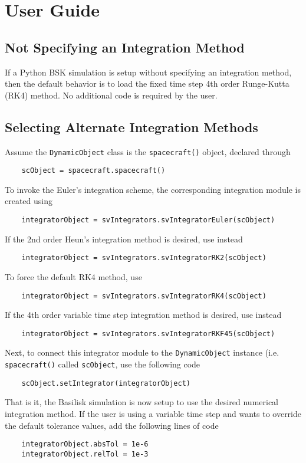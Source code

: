 
\section{User Guide}

\subsection{Not Specifying an Integration Method}
If a Python BSK simulation is setup without specifying an integration method, then the default behavior is to load the fixed time step 4th order Runge-Kutta (RK4) method.  No additional code is required by the user.


\subsection{Selecting Alternate Integration Methods}
Assume the {\tt DynamicObject} class is the {\tt spacecraft()} object, declared through
\begin{verbatim}
	scObject = spacecraft.spacecraft()
\end{verbatim}
To invoke the Euler's  integration scheme, the corresponding integration module is created using
\begin{verbatim}
	integratorObject = svIntegrators.svIntegratorEuler(scObject)
\end{verbatim}
If the 2nd order Heun's integration method is desired, use instead
\begin{verbatim}
	integratorObject = svIntegrators.svIntegratorRK2(scObject)
\end{verbatim}
To force the default RK4 method, use
\begin{verbatim}
	integratorObject = svIntegrators.svIntegratorRK4(scObject)
\end{verbatim}
If the 4th order variable time step integration method is desired, use instead
\begin{verbatim}
	integratorObject = svIntegrators.svIntegratorRKF45(scObject)
\end{verbatim}

Next, to connect this integrator module to the {\tt DynamicObject} instance (i.e. {\tt spacecraft()} called {\tt scObject}, use the following code
\begin{verbatim}
	scObject.setIntegrator(integratorObject)
\end{verbatim}
That is it, the Basilisk simulation is now setup to use the desired numerical  integration method. If the user is using a variable time step and wants to override the default tolerance values, add the following lines of code
\begin{verbatim}
	integratorObject.absTol = 1e-6
	integratorObject.relTol = 1e-3
\end{verbatim}

